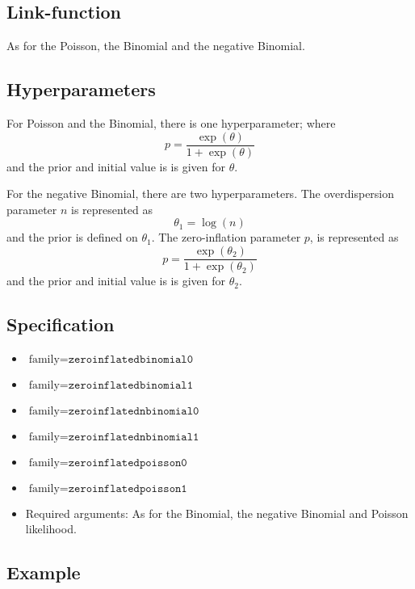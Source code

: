 \documentclass[a4paper,11pt]{article}
\begin{document}
\subsection*{Link-function}

As for the Poisson, the Binomial and the negative Binomial.

\subsection*{Hyperparameters}

For Poisson and the Binomial, there is one hyperparameter; where
\begin{displaymath}
    p = \frac{\exp(\theta)}{1+\exp(\theta)}
\end{displaymath}
and the prior and initial value is is given for $\theta$.

For the negative Binomial, there are two hyperparameters.  The
overdispersion parameter $n$ is represented as
\begin{displaymath}
    \theta_{1} = \log(n)
\end{displaymath}
and the prior is defined on $\theta_{1}$. The zero-inflation parameter
$p$, is represented as
\begin{displaymath}
    p = \frac{\exp(\theta_{2})}{1+\exp(\theta_{2})}
\end{displaymath}
and the prior and initial value is is given for  $\theta_{2}$.

\subsection*{Specification}

\begin{itemize}
\item $\text{family}=\texttt{zeroinflatedbinomial0}$
\item $\text{family}=\texttt{zeroinflatedbinomial1}$
\item $\text{family}=\texttt{zeroinflatednbinomial0}$
\item $\text{family}=\texttt{zeroinflatednbinomial1}$
\item $\text{family}=\texttt{zeroinflatedpoisson0}$
\item $\text{family}=\texttt{zeroinflatedpoisson1}$
\item Required arguments: As for the Binomial, the negative Binomial
    and Poisson likelihood.
\end{itemize}

\subsection*{Example}
\end{document}
